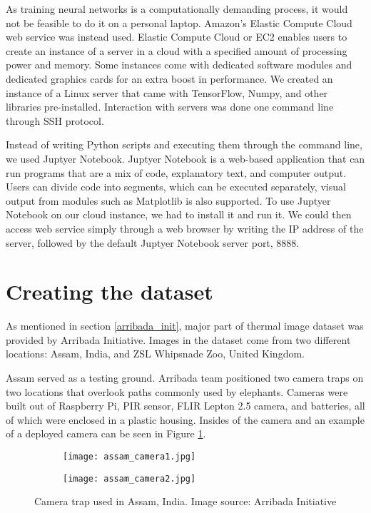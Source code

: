 As training neural networks is a computationally demanding process, it would not be feasible to do it on a personal laptop.
Amazon's Elastic Compute Cloud web service was instead used.
Elastic Compute Cloud or EC2 enables users to create an instance of a server in a cloud with a specified amount of processing power and memory.
Some instances come with dedicated software modules and dedicated graphics cards for an extra boost in performance.
We created an instance of a Linux server that came with TensorFlow, Numpy, and other libraries pre-installed.
Interaction with servers was done one command line through SSH protocol.

Instead of writing Python scripts and executing them through the command line, we used Juptyer Notebook. 
Juptyer Notebook is a web-based application that can run programs that are a mix of code, explanatory text, and computer output.
Users can divide code into segments, which can be executed separately, visual output from modules such as Matplotlib is also supported.
To use Juptyer Notebook on our cloud instance, we had to install it and run it.
We could then access web service simply through a web browser by writing the IP address of the server, followed by the default Juptyer Notebook server port, 8888.


\section{ Creating the dataset}

As mentioned in section \ref{arribada_init}, major part of thermal image dataset was provided by Arribada Initiative\cite{wildlabs-winners}\cite{arribada-assam}.
Images in the dataset come from two different locations: Assam, India, and ZSL Whipsnade Zoo, United Kingdom.

Assam served as a testing ground.
Arribada team positioned two camera traps on two locations that overlook paths commonly used by elephants.
Cameras were built out of Raspberry Pi, PIR sensor, FLIR Lepton 2.5 camera, and batteries, all of which were enclosed in a plastic housing.
Insides of the camera and an example of a deployed camera can be seen in Figure \ref{assam_camera}.

\begin{figure}[ht]
    \begin{subfigure}{0.5\textwidth}
        \centering
        \texttt{[image: assam\_camera1.jpg]} 
    \end{subfigure}
    \begin{subfigure}{0.5\textwidth}
        \centering
        \texttt{[image: assam\_camera2.jpg]}
    \end{subfigure}
    \caption{Camera trap used in Assam, India. Image source: Arribada Initiative \cite{arribada-assam}}
    \label{assam_camera}
\end{figure}

